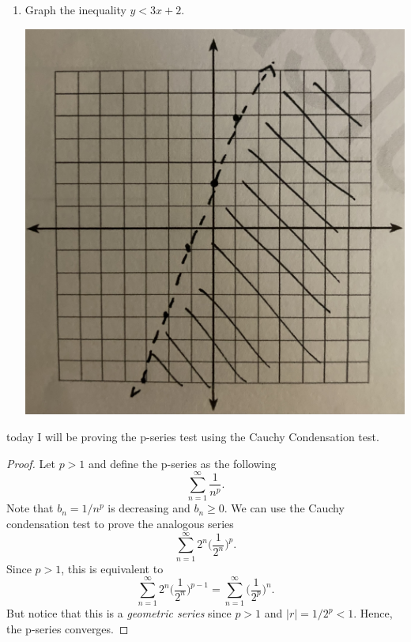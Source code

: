 \documentclass{article}
\begin{document}
\begin{enumerate}
\begin{proof}[Solution]
   \begin{align}
       3x + 4y &= 125  \\
       2x + 3y &= 90 .
   \end{align} 
   Let us multiply (1) and (2) by \(  2 \) and \( -3 \) respectively and then add them together 
   \begin{align*}
       2(3x + 4y) -3(2x+3y) &= 250 -270 \\
       6x + 8y - 6x -9y &= -20 \\
       8y-9y &= -20 \\
   \end{align*}
   which implies \( y = 20 \). Now we solve (1) for \(x\) to get 
   \[ x = \frac{1}{3} (125 - 4y) = \frac{1}{3}(125 - 4(20)) = 15.\]
   Hence, \( x = 15\). \textbf{This means that each T-shirt costs \( \$ 15 \) and each dress costs \( \$ 20\).}
 \end{proof}
\item Graph the inequality \( y < 3x + 2\).
\begin{center}
    \includegraphics[width = 0.5 \textwidth]{67}
\end{center}
\end{enumerate}
today I will be proving the p-series test using the Cauchy Condensation test.
\begin{tcolorbox}
\begin{proof}
Let \( p > 1 \) and define the p-series as the following
\[ \sum_{n=1}^{\infty} \frac{1}{n^p}. \] 
Note that \( b_n = 1/n^p \) is decreasing and \( b_n \geq 0 \). We can use the Cauchy condensation test to prove the analogous series
\[ \sum_{n=1}^{\infty} 2^n \Big( \frac{1}{2^{n}} \Big)^p. \]
Since \( p > 1 \), this is equivalent to 
\[ \sum_{n=1}^{\infty} 2^n \Big(\frac{1}{2^n} \Big)^{p-1} = \sum_{n=1}^{\infty} \Big( \frac{1}{2^p}\Big)^n.\]
But notice that this is a \textit{geometric series} since \( p > 1 \) and \( |r| = 1/2^p < 1 \). Hence, the p-series converges.

\end{proof}
\end{tcolorbox}
\end{document}
